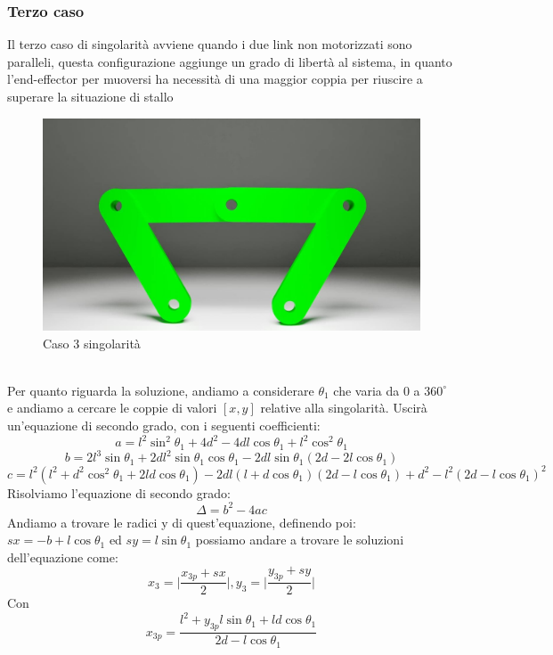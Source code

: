 \subsubsection*{Terzo caso}
Il terzo caso di singolarità avviene quando i due link non motorizzati sono paralleli, questa configurazione aggiunge un grado di libertà al sistema, in quanto l'end-effector per muoversi ha necessità di una maggior coppia per riuscire a superare la situazione di stallo
\begin{figure}[ht]
	\begin{center}
		\includegraphics[scale=0.4]{Immagini/Singolarity/5}
		\caption{Caso 3 singolarità}
	\end{center}
\end{figure}
\\Per quanto riguarda la soluzione, andiamo a considerare $\theta_1$ che varia da 0 a $360^\circ$ e andiamo a cercare le coppie di valori $[x,y]$ relative alla singolarità. Uscirà un'equazione di secondo grado, con i seguenti coefficienti:
\begin{equation*}
	a = l^2\sin^2\theta_1 + 4d^2-4dl\cos\theta_1 + l^2\cos^2\theta_1
\end{equation*}
\begin{equation*}
	b = 2l^3\sin\theta_1 + 2dl^2\sin\theta_1\cos\theta_1-2dl\sin\theta_1(2d-2l\cos\theta_1)
\end{equation*}
\begin{equation*}
	c = l^2(l^2+d^2\cos^2\theta_1+2ld\cos\theta_1)-2dl(l+d\cos\theta_1)(2d-l\cos\theta_1)+d^2-l^2(2d-l\cos\theta_1)^2
\end{equation*}
Risolviamo l'equazione di secondo grado:
\begin{equation*}
	\Delta = b^2-4ac
\end{equation*}
Andiamo a trovare le radici y di quest'equazione, definendo poi: $sx = -b+l\cos\theta_1$ ed $sy = l\sin\theta_1$ possiamo andare a trovare le soluzioni dell'equazione come:
\begin{equation}
	x_3 = \bigg|\frac{x_{3p}+sx}{2}\bigg|, y_3 = \bigg|\frac{y_{3p}+sy}{2}\bigg|
\end{equation}
Con 
\begin{equation*}
	x_{3p} = \frac{l^2+y_{3p}l\sin\theta_1+ld\cos\theta_1}{2d-l\cos\theta_1}
\end{equation*}

